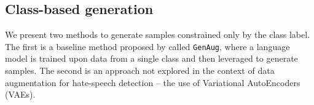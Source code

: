 \documentclass[11pt,a4paper]{article}
\begin{document}
\subsection*{Class-based generation}
We present two methods to generate samples constrained only by the class label. The first is a baseline method proposed by \citet{aug2prev} called \texttt{GenAug}, where a language model is trained upon data from a single class and then leveraged to generate samples. The second is an approach not explored in the context of data augmentation for hate-speech detection -- the use of Variational AutoEncoders (VAEs).

\end{document}
